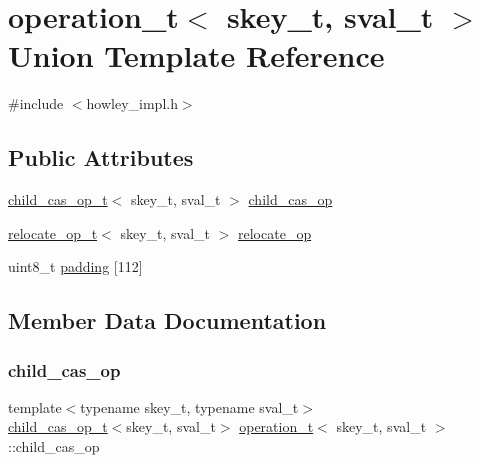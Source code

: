 \hypertarget{unionoperation__t}{}\section{operation\+\_\+t$<$ skey\+\_\+t, sval\+\_\+t $>$ Union Template Reference}
\label{unionoperation__t}


{\ttfamily \#include $<$howley\+\_\+impl.\+h$>$}

\subsection*{Public Attributes}
\begin{DoxyCompactItemize}
\item 
\hyperlink{structchild__cas__op__t}{child\+\_\+cas\+\_\+op\+\_\+t}$<$ skey\+\_\+t, sval\+\_\+t $>$ \hyperlink{unionoperation__t_acbedd3f8b930f90675bfe965d93ad3f3}{child\+\_\+cas\+\_\+op}
\item 
\hyperlink{structrelocate__op__t}{relocate\+\_\+op\+\_\+t}$<$ skey\+\_\+t, sval\+\_\+t $>$ \hyperlink{unionoperation__t_a8604de36b950c8d7218afde0bb69678c}{relocate\+\_\+op}
\item 
uint8\+\_\+t \hyperlink{unionoperation__t_a31d6c729884c52c6b10b2038fbce49dc}{padding} \mbox{[}112\mbox{]}
\end{DoxyCompactItemize}


\subsection{Member Data Documentation}
\mbox{\label{unionoperation__t_acbedd3f8b930f90675bfe965d93ad3f3}} 
\subsubsection{\texorpdfstring{child\+\_\+cas\+\_\+op}{child\_cas\_op}}
{\footnotesize\ttfamily template$<$typename skey\+\_\+t, typename sval\+\_\+t$>$ \\
\hyperlink{structchild__cas__op__t}{child\+\_\+cas\+\_\+op\+\_\+t}$<$skey\+\_\+t, sval\+\_\+t$>$ \hyperlink{unionoperation__t}{operation\+\_\+t}$<$ skey\+\_\+t, sval\+\_\+t $>$\+::child\+\_\+cas\+\_\+op}

